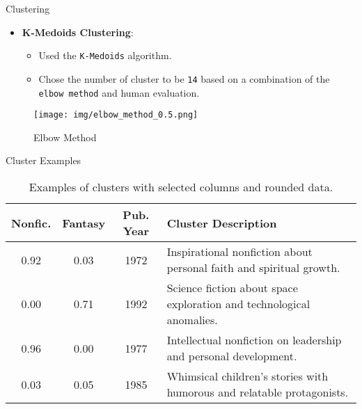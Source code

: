 \documentclass{beamer}
\begin{document}
\begin{frame}{Clustering}
    \begin{itemize}
        \item \textbf{K-Medoids Clustering}:
            \begin{itemize}
                \item Used the \texttt{K-Medoids} algorithm.
                \item Chose the number of cluster to be \texttt{14} based on a combination of the \texttt{elbow method} and human evaluation.
            \end{itemize}
    \end{itemize}
    \begin{figure}
        \centering
        \texttt{[image: img/elbow\_method\_0.5.png]}
        \caption{Elbow Method}
    \end{figure}
\end{frame}

\begin{frame}{Cluster Examples}
\begin{table}[]
\centering
\begin{tabular}{|c|c|c|p{6cm}|}
\hline
\textbf{Nonfic.} & \textbf{Fantasy} & \textbf{Pub. Year} & \textbf{Cluster Description} \\ \hline
0.92                & 0.03             & 1972                  & Inspirational nonfiction about personal faith and spiritual growth.     \\ \hline
0.00                & 0.71             & 1992                  & Science fiction about space exploration and technological anomalies. \\ \hline
0.96                & 0.00             & 1977                  & Intellectual nonfiction on leadership and personal development. \\ \hline
0.03                & 0.05             & 1985                  & Whimsical children's stories with humorous and relatable protagonists. \\ \hline
\end{tabular}
\caption{Examples of clusters with selected columns and rounded data.}
\end{table}
\end{frame}
\end{document}
